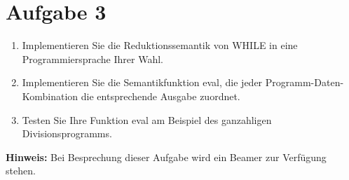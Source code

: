 \documentclass[ngerman,a4paper]{report}
\begin{document}
\section*{Aufgabe 3 }
\begin{enumerate}
	\item Implementieren Sie die Reduktionssemantik von WHILE in eine Programmiersprache Ihrer Wahl.
	\item Implementieren Sie die Semantikfunktion eval, die jeder Programm-Daten-Kombination die entsprechende Ausgabe zuordnet.
	\item Testen Sie Ihre Funktion eval am Beispiel des ganzahligen Divisionsprogramms.
\end{enumerate}
\textbf{Hinweis:} Bei Besprechung dieser Aufgabe wird ein Beamer zur Verfügung stehen.
\end{document}
